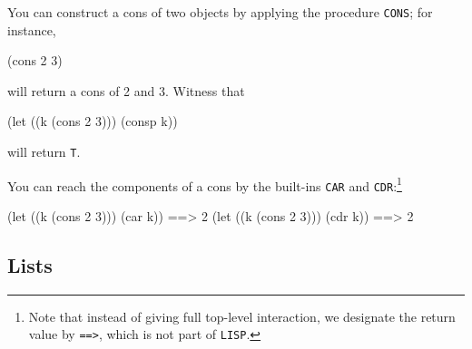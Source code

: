 \documentclass[a4paper,11pt]{article}
\begin{document}
\begin{uenum}
\item You can construct a cons of two objects by applying the procedure \Verb+CONS+; for instance, 

\begin{lispcode}
(cons 2 3)
\end{lispcode}

will return a cons of 2 and 3. Witness that 

\begin{lispcode}
(let ((k (cons 2 3)))
    (consp k))
\end{lispcode}

will return \Verb+T+.

You can reach the components of a cons by the built-ins \Verb+CAR+ and \Verb+CDR+:\footnote{Note that instead of giving full top-level interaction, we designate the return value by \Verb+==>+, which is not part of \Verb+LISP+.}

\begin{lispcode}
(let ((k (cons 2 3))) (car k)) ==> 2 
(let ((k (cons 2 3))) (cdr k)) ==> 2 
\end{lispcode}

\end{uenum}

\subsection{Lists}
\end{document}
